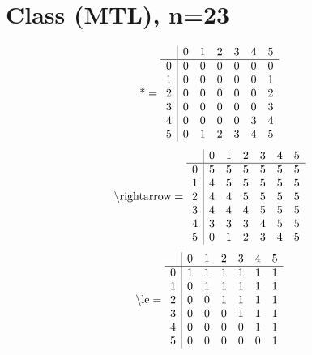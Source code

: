 \documentclass[11pt]{article}
\begin{document}
\section{Class (MTL), n=23}
\[\text{*} = 
\begin{array}{r | r r r r r r}
 & 0 & 1 & 2 & 3 & 4 & 5 \\ \hline
0 & 0 & 0 & 0 & 0 & 0 & 0 \\
1 & 0 & 0 & 0 & 0 & 0 & 1 \\
2 & 0 & 0 & 0 & 0 & 0 & 2 \\
3 & 0 & 0 & 0 & 0 & 0 & 3 \\
4 & 0 & 0 & 0 & 0 & 3 & 4 \\
5 & 0 & 1 & 2 & 3 & 4 & 5 \\
\end{array}
\]
\[\text{\textbackslash rightarrow} = 
\begin{array}{r | r r r r r r}
 & 0 & 1 & 2 & 3 & 4 & 5 \\ \hline
0 & 5 & 5 & 5 & 5 & 5 & 5 \\
1 & 4 & 5 & 5 & 5 & 5 & 5 \\
2 & 4 & 4 & 5 & 5 & 5 & 5 \\
3 & 4 & 4 & 4 & 5 & 5 & 5 \\
4 & 3 & 3 & 3 & 4 & 5 & 5 \\
5 & 0 & 1 & 2 & 3 & 4 & 5 \\
\end{array}
\]
\[\text{\textbackslash le} = 
\begin{array}{r | r r r r r r}
 & 0 & 1 & 2 & 3 & 4 & 5 \\ \hline
0 & 1 & 1 & 1 & 1 & 1 & 1 \\
1 & 0 & 1 & 1 & 1 & 1 & 1 \\
2 & 0 & 0 & 1 & 1 & 1 & 1 \\
3 & 0 & 0 & 0 & 1 & 1 & 1 \\
4 & 0 & 0 & 0 & 0 & 1 & 1 \\
5 & 0 & 0 & 0 & 0 & 0 & 1 \\
\end{array}
\]
\end{document}
